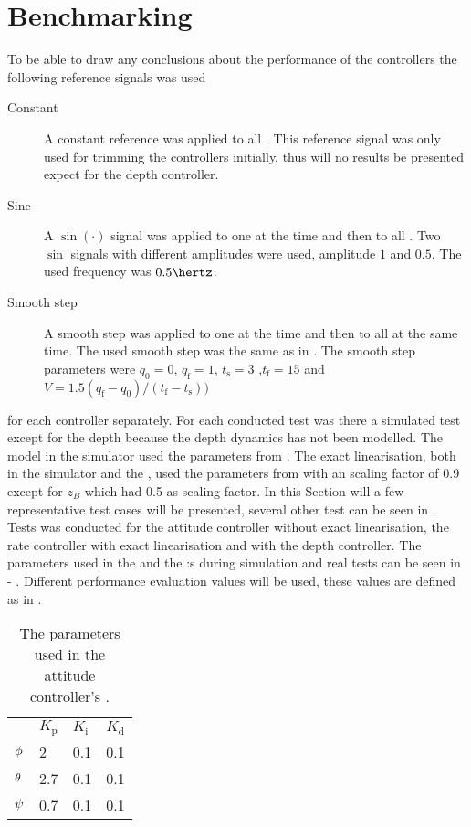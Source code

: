 \section{Benchmarking}
To be able to draw any conclusions about the performance of the controllers the following reference signals was used
\begin{description}
\item[Constant] A constant reference was applied to all \abbrDOF. This reference signal was only used for trimming the controllers initially, thus will no results be presented expect for the depth controller.

\item[Sine] A $\sin(\cdot)$ signal was applied to one \abbrDOF at the time and then to all \abbrDOF. Two $\sin$ signals with different amplitudes were used, amplitude $1$ and $0.5$. The used frequency was $0.5 \hertz$.

\item[Smooth step] A smooth step was applied to one \abbrDOF at the time and then to all \abbrDOF at the same time. The used smooth step was the same as in \citet[p. 192-195]{robotics}. The smooth step parameters were $q_{\text{0}} = 0$, $q_{\text{f}} = 1$, $t_{\text{s}} = 3$ ,$t_{\text{f}} = 15$ and $V = 1.5 (q_{\text{f}} - q_{\text{0}})/(t_{\text{f}} - t_{\text{s}}))$
\end{description}
for each controller separately. For each conducted test was there a simulated test except for the depth because the depth dynamics has not been modelled. The \abbrROV model in the simulator used the parameters from . The exact linearisation, both in the simulator and the \abbrROV, used the parameters from  with an scaling factor of 0.9 except for $z_B$ which had 0.5 as scaling factor. In this Section will a few representative test cases will be presented,  several other test can be seen in . Tests was conducted for the \abbrPID attitude controller without exact linearisation, the \abbrPI rate controller with exact linearisation and with the \abbrPI depth controller. The parameters used in the \abbrPID and the \abbrPI:s during simulation and real tests can be seen in  - . Different performance evaluation values will be used, these values are defined as in \citet{reglerteori}. 

\begin{table}[tbp]
  \centering
  \caption{\label{tab:parametersAttitude}%
    The parameters used in the attitude controller's \abbrPID.}
  \begin{tabular}{l l l l}
    \toprule%
       & \textbf{$K_\text{p}$} & \textbf{$K_\text{i}$}& \textbf{$K_\text{d}$}\\
    \otoprule%
    $\phi$  & 2   & 0.1 & 0.1 \\
    $\theta$ & 2.7 & 0.1 & 0.1 \\
    $\psi$   & 0.7 & 0.1 & 0.1 \\
    \bottomrule%
  \end{tabular}
\end{table}

